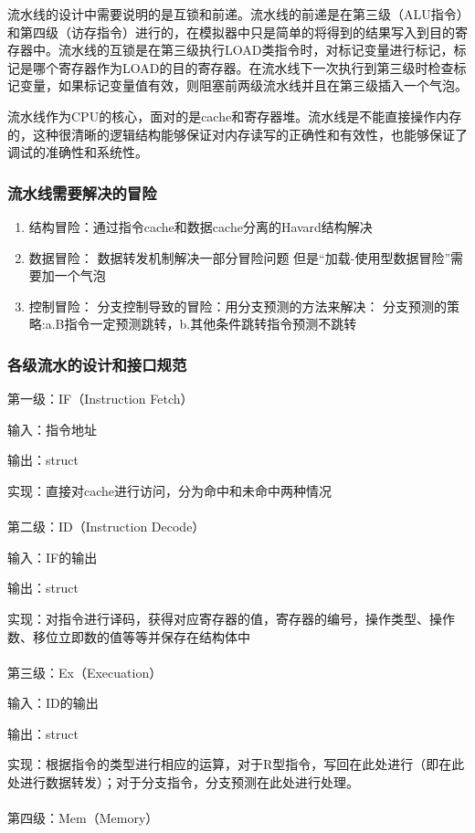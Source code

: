 \documentclass[12pt,a4paper]{article}
\begin{document}
流水线的设计中需要说明的是互锁和前递。流水线的前递是在第三级（ALU指令）和第四级（访存指令）进行的，在模拟器中只是简单的将得到的结果写入到目的寄存器中。流水线的互锁是在第三级执行LOAD类指令时，对标记变量进行标记，标记是哪个寄存器作为LOAD的目的寄存器。在流水线下一次执行到第三级时检查标记变量，如果标记变量值有效，则阻塞前两级流水线并且在第三级插入一个气泡。

流水线作为CPU的核心，面对的是cache和寄存器堆。流水线是不能直接操作内存的，这种很清晰的逻辑结构能够保证对内存读写的正确性和有效性，也能够保证了调试的准确性和系统性。

\subsubsection{流水线需要解决的冒险}
\begin{enumerate}
\item 结构冒险：通过指令cache和数据cache分离的Havard结构解决
\item 数据冒险：
	\subitem 数据转发机制解决一部分冒险问题
	\subitem 但是“加载-使用型数据冒险”需要加一个气泡
\item 控制冒险：
	\subitem 分支控制导致的冒险：用分支预测的方法来解决：
	\subitem 分支预测的策略:a.B指令一定预测跳转，b.其他条件跳转指令预测不跳转
\end{enumerate}

\subsubsection{各级流水的设计和接口规范}
\noindent 第一级：IF（Instruction Fetch）

输入：指令地址

输出：struct

实现：直接对cache进行访问，分为命中和未命中两种情况\\\\
第二级：ID（Instruction Decode）

输入：IF的输出

输出：struct

实现：对指令进行译码，获得对应寄存器的值，寄存器的编号，操作类型、操作数、移位立即数的值等等并保存在结构体中\\\\
第三级：Ex（Execuation）

输入：ID的输出

输出：struct

实现：根据指令的类型进行相应的运算，对于R型指令，写回在此处进行（即在此处进行数据转发）；对于分支指令，分支预测在此处进行处理。\\\\
第四级：Mem（Memory）
\end{document}
